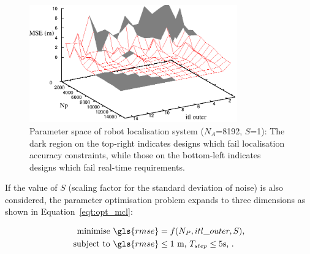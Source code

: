 \begin{figure}[t!]
\begin{center}
\includegraphics[width=0.8\textwidth]{5_tool/figures/fig_mcl_2d}
\end{center}
\caption{Parameter space of robot localisation system ($N_A$=8192, $S$=1): The dark region on the top-right indicates designs which fail localisation accuracy constraints, while those on the bottom-left indicates designs which fail real-time requirements.}
\label{fig:mcl_2d}
\end{figure}

If the value of $S$ (scaling factor for the standard deviation of noise) is also considered, the parameter optimisation problem expands to three dimensions as shown in Equation~\ref{eqt:opt_mcl}:

\begin{equation}
\begin{aligned}
\mbox{minimise } \gls{rmse} &= f(N_P, itl\_outer, S) \mbox{,} \\
\mbox{subject to } \gls{rmse} & \leq \mbox{1 m, } T_{step} \leq \mbox{5s, } \mbox{.}
\end{aligned}
\label{eqt:opt_mcl}
\end{equation}


